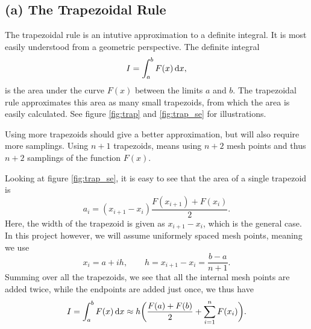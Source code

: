 \documentclass[a4paper, 11pt, notitlepage, english]{article}
\renewcommand{\d}{{\rm d}}
\begin{document}
\subsection*{(a) The Trapezoidal Rule}
The trapezoidal rule is an intutive approximation to a definite integral. It is most easily understood from a geometric perspective. The definite integral 
$$I = \int_a^b F(x) \, \d x,$$
is the area under the curve $F(x)$ between the limits $a$ and $b$. The trapezoidal rule approximates this area as many small trapezoids, from which the area is easily calculated. See figure \ref{fig:trap} and \ref{fig:trap_se} for illustrations. 

Using more trapezoids should give a better approximation, but will also require more samplings. Using $n+1$ trapezoids, means using $n+2$ mesh points and thus $n+2$ samplings of the function $F(x)$.

Looking at figure \ref{fig:trap_se}, it is easy to see that the area of a single trapezoid is
$$a_i = (x_{i+1}-x_{i})\frac{F(x_{i+1}) + F(x_i)}{2}.$$
Here, the width of the trapezoid is given as $x_{i+1}-x_{i}$, which is the general case. In this project however, we will assume uniformely spaced mesh points, meaning we use
$$x_{i} = a + ih, \qquad h = x_{i+1}-x_i = \frac{b-a}{n+1}.$$
Summing over all the trapezoids, we see that all the internal mesh points are added twice, while the endpoints are added just once, we thus have
$$I = \int_a^b F(x) \, \d x \approx h\bigg( \frac{F(a)+F(b)}{2} + \sum_{i=1}^n F(x_i)\bigg).$$
\end{document}

